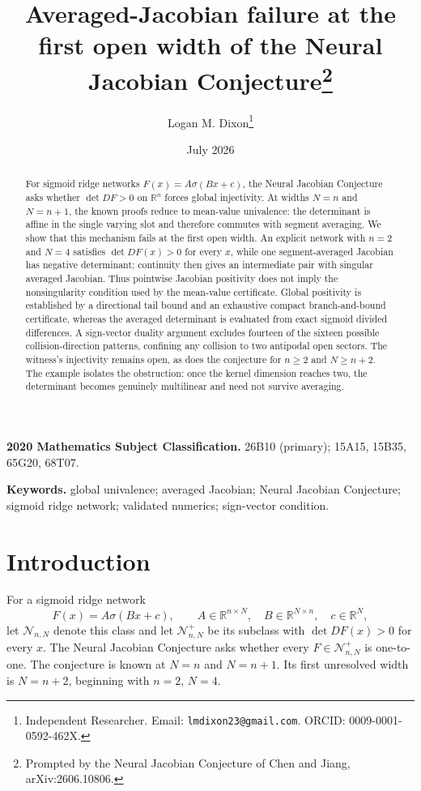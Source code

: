 \documentclass[11pt]{article}
\title{Averaged-Jacobian failure at the first open width of the Neural Jacobian Conjecture\thanks{Prompted by the Neural Jacobian Conjecture of Chen and Jiang, arXiv:2606.10806.}}
\author{Logan M. Dixon\thanks{Independent Researcher. Email:
\texttt{lmdixon23@gmail.com}. ORCID: 0009-0001-0592-462X.}}
\date{July 2026}
\theoremstyle{definition}
\theoremstyle{remark}
\begin{document}
\maketitle

\begin{abstract}
For sigmoid ridge networks $F(x)=A\sigma(Bx+c)$, the Neural Jacobian Conjecture asks whether
$\det DF>0$ on $\mathbb R^n$ forces global injectivity. At widths $N=n$ and $N=n+1$, the known
proofs reduce to mean-value univalence: the determinant is affine in the single varying slot and
therefore commutes with segment averaging. We show that this mechanism fails at the first open
width. An explicit network with $n=2$ and $N=4$ satisfies $\det DF(x)>0$ for every $x$, while one
segment-averaged Jacobian has negative determinant; continuity then gives an intermediate pair with
singular averaged Jacobian. Thus pointwise Jacobian positivity does not imply the nonsingularity
condition used by the mean-value certificate. Global positivity is established by a directional tail
bound and an exhaustive compact branch-and-bound certificate, whereas the averaged determinant is
evaluated from exact sigmoid divided differences. A sign-vector duality argument excludes fourteen
of the sixteen possible collision-direction patterns, confining any collision to two antipodal open
sectors. The witness's injectivity remains open, as does the conjecture for $n\ge2$ and
$N\ge n+2$. The example isolates the obstruction: once the kernel dimension reaches two, the
determinant becomes genuinely multilinear and need not survive averaging.
\end{abstract}

\medskip
\noindent\textbf{2020 Mathematics Subject Classification.} 26B10 (primary); 15A15, 15B35, 65G20, 68T07.

\smallskip
\noindent\textbf{Keywords.} global univalence; averaged Jacobian; Neural Jacobian Conjecture;
sigmoid ridge network; validated numerics; sign-vector condition.

\section{Introduction}\label{sec:intro}
For a sigmoid ridge network
\[
F(x)=A\sigma(Bx+c),\qquad
A\in\mathbb R^{n\times N},\quad B\in\mathbb R^{N\times n},\quad c\in\mathbb R^N,
\]
let $\mathcal N_{n,N}$ denote this class and let $\mathcal N^+_{n,N}$ be its subclass with
$\det DF(x)>0$ for every $x$. The Neural Jacobian Conjecture asks whether every
$F\in\mathcal N^+_{n,N}$ is one-to-one. The conjecture is known at $N=n$ and $N=n+1$. Its first unresolved width is
$N=n+2$, beginning with $n=2$, $N=4$.
\end{document}
